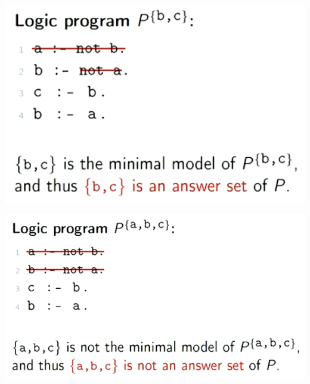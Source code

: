 \begin{minipage}{0.5\textwidth}
\includegraphics[scale=0.75]{figures/asp1.png}
\end{minipage}
\begin{minipage}{0.5\textwidth}
\includegraphics[scale=0.75]{figures/asp2.png}
\end{minipage}

\vspace{0.5cm}

